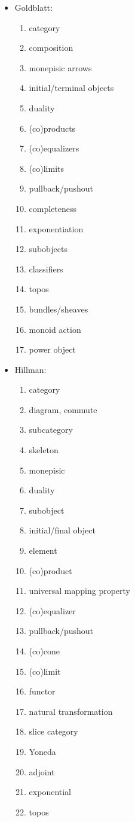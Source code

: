 \documentclass[11pt,openany]{book}
\begin{document}
\begin{itemize}
\item Goldblatt:~\cite{goldblatt_1984_topoi}
\begin{enumerate}
  \item category
  \item composition
  \item monepisic arrows
  \item initial/terminal objects
  \item duality
  \item (co)products
  \item (co)equalizers
  \item (co)limits
  \item pullback/pushout
  \item completeness
  \item exponentiation
  \item subobjects
  \item classifiers
  \item topos
  \item bundles/sheaves
  \item monoid action
  \item power object
\end{enumerate}

\item Hillman:~\cite{hillman_2001_cat_primer}
\begin{enumerate}
  \item category
  \item diagram, commute
  \item subcategory
  \item skeleton
  \item monepisic
  \item duality
  \item subobject
  \item initial/final object
  \item element
  \item (co)product
  \item universal mapping property
  \item (co)equalizer
  \item pullback/pushout
  \item (co)cone
  \item (co)limit
  \item functor
  \item natural transformation
  \item slice category
  \item Yoneda
  \item adjoint
  \item exponential
  \item topos
\end{enumerate}


\end{itemize}
\end{document}
